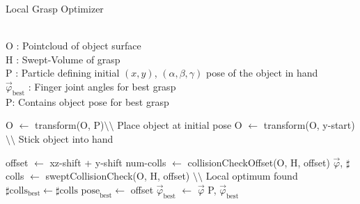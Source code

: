 \begin{algorithm}[ht]
	\caption{\label{alg:pre_optimizer}Local Grasp Optimizer}
	\begin{algorithmic}[1]
		\REQUIRE ~\\
		O : Pointcloud of object surface \\ 
		H : Swept-Volume of grasp \\ 
		P : Particle defining initial $(x,y)$, $(\alpha,\beta,\gamma)$ pose of the object in hand
		\ENSURE ~\\
		
		$\vec{\varphi}_{\text{best}}$ : Finger joint angles for best grasp \\
		P: Contains object pose for best grasp
		
		\STATE O $\leftarrow$ transform(O, P)\hfill $\setminus\setminus$ Place object at initial pose
		\STATE O $\leftarrow$ transform(O, y-start)\hfill $\setminus\setminus$ Stick object into hand
		
		\STATE offset $\leftarrow$ xz-shift + y-shift
		\STATE num-colls $\leftarrow$ collisionCheckOffset(O, H, offset)
		\STATE $\vec{\varphi}$, $\sharp$colls $\leftarrow$ sweptCollisionCheck(O, H, offset)
		\STATE \hfill $\setminus\setminus$ Local optimum found
		\STATE $\sharp\text{colls}_\text{best} \leftarrow \sharp\text{colls}$
		\STATE $\text{pose}_\text{best} \leftarrow$ offset
		\STATE $\vec{\varphi}_{\text{best}}$ $\leftarrow$ $\vec{\varphi}$
		\ENDIF
		\ENDIF
		\ENDFOR
		\ENDFOR
		\RETURN P, $\vec{\varphi}_{\text{best}}$
	\end{algorithmic}
\end{algorithm}
